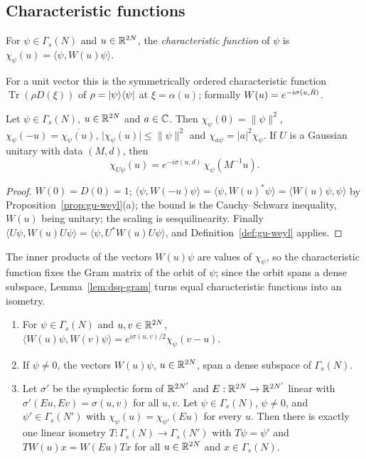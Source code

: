 \begin{veteenv}
\subsection{Characteristic functions}\label{sec:pg-charfun}

\begin{definition}\label{def:pg-charfun}
For $\psi\in\Gamma_s(N)$ and $u\in\mathbb R^{2N}$, the \emph{characteristic function} of $\psi$ is $\chi_\psi(u)=\langle\psi,W(u)\psi\rangle$.
\end{definition}

For a unit vector this is the symmetrically ordered characteristic function $\operatorname{Tr}(\rho D(\xi))$ of
$\rho=\lvert \psi\rangle\langle\psi\rvert$ at $\xi=\alpha(u)$; formally $W(u)=e^{-i\sigma(u,\hat R)}$.

\begin{lemma}\label{lem:pg-charfun}
Let $\psi\in\Gamma_s(N)$, $u\in\mathbb R^{2N}$ and $a\in\mathbb C$. Then $\chi_\psi(0)=\lVert\psi\rVert^2$, $\chi_\psi(-u)=\overline{\chi_\psi(u)}$,
$\lvert\chi_\psi(u)\rvert\le\lVert\psi\rVert^2$ and $\chi_{a\psi}=\lvert a\rvert^2\chi_\psi$. If $U$ is a Gaussian unitary with data $(M,d)$, then
\[
 \chi_{U\psi}(u)=e^{-i\sigma(u,d)}\,\chi_\psi(M^{-1}u).
\]
\end{lemma}

\begin{proof}
$W(0)=D(0)=1$; $\langle\psi,W(-u)\psi\rangle=\langle\psi,W(u)^*\psi\rangle=\langle W(u)\psi,\psi\rangle$ by
Proposition~\ref{prop:gu-weyl}(a); the bound is the Cauchy--Schwarz inequality, $W(u)$ being unitary; the scaling is sesquilinearity. Finally
$\langle U\psi,W(u)U\psi\rangle=\langle\psi,U^*W(u)U\psi\rangle$, and Definition~\ref{def:gu-weyl} applies.
\end{proof}

The inner products of the vectors $W(u)\psi$ are values of $\chi_\psi$, so the characteristic function fixes the Gram matrix of
the orbit of $\psi$; since the orbit spans a dense subspace, Lemma~\ref{lem:dsq-gram} turns equal characteristic functions into
an isometry.

\begin{lemma}\label{lem:pg-intertwiner}
\begin{enumerate}
\item[(a)] For $\psi\in\Gamma_s(N)$ and $u,v\in\mathbb R^{2N}$, $\langle W(u)\psi,W(v)\psi\rangle=e^{i\sigma(u,v)/2}\chi_\psi(v-u)$.
\item[(b)] If $\psi\ne0$, the vectors $W(u)\psi$, $u\in\mathbb R^{2N}$, span a dense subspace of $\Gamma_s(N)$.
\item[(c)] Let $\sigma'$ be the symplectic form of $\mathbb R^{2N'}$ and $E:\mathbb R^{2N}\to\mathbb R^{2N'}$ linear with $\sigma'(Eu,Ev)=\sigma(u,v)$ for all $u,v$.
Let $\psi\in\Gamma_s(N)$, $\psi\ne0$, and $\psi'\in\Gamma_s(N')$ with $\chi_\psi(u)=\chi_{\psi'}(Eu)$ for every $u$. Then there is exactly one
linear isometry $T:\Gamma_s(N)\to\Gamma_s(N')$ with $T\psi=\psi'$ and $TW(u)x=W(Eu)Tx$ for all $u\in\mathbb R^{2N}$ and $x\in\Gamma_s(N)$.
\end{enumerate}
\end{lemma}


\end{veteenv}
